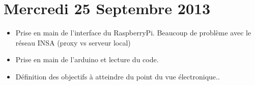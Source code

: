 \documentclass[a4paper, 12pt, french]{article}
\begin{document}
	\section*{Mercredi 25 Septembre 2013} %
	\label{sec:mercredi_25_septembre_2013}
	\begin{itemize}
			\item Prise en main de l'interface du RaspberryPi. Beaucoup de problème avec le réseau INSA (proxy vs serveur local)
			\item Prise en main de l'arduino et lecture du code.
			\item Définition des objectifs à atteindre du point du vue électronique..
	\end{itemize}	
\end{document}
